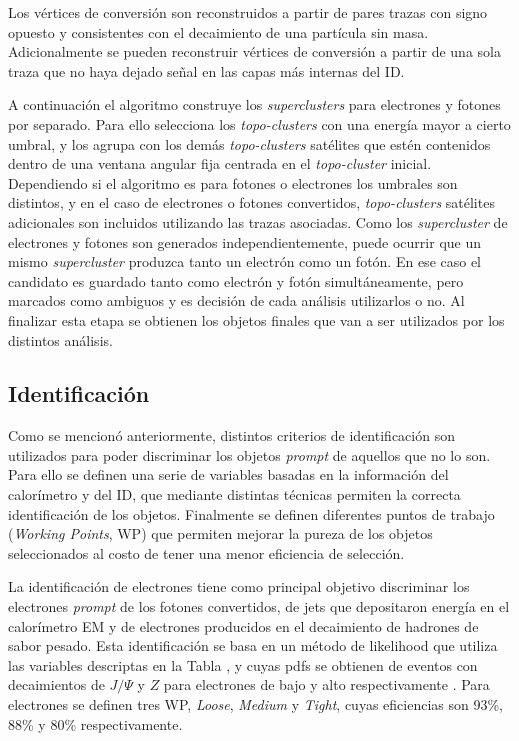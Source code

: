 Los vértices de conversión son reconstruidos a partir de pares trazas con signo opuesto y consistentes con el decaimiento de una partícula sin masa. Adicionalmente se pueden reconstruir vértices de conversión a partir de una sola traza que no haya dejado señal en las capas más internas del ID.

A continuación el algoritmo construye los \textit{superclusters} para electrones y fotones por separado. Para ello selecciona los \textit{topo-clusters} con una energía mayor a cierto  umbral, y los agrupa con los demás \textit{topo-clusters} satélites que estén contenidos dentro de una ventana angular fija centrada en el \textit{topo-cluster} inicial. Dependiendo si el algoritmo es para fotones o electrones los umbrales son distintos, y en el caso de electrones o fotones convertidos, \textit{topo-clusters} satélites adicionales son incluidos utilizando las trazas asociadas. Como los \textit{supercluster} de electrones y fotones son generados independientemente, puede ocurrir que un mismo \textit{supercluster} produzca tanto un electrón como un fotón. En ese caso el candidato es guardado tanto como electrón y fotón simultáneamente, pero marcados como ambiguos y es decisión de cada análisis utilizarlos o no. Al finalizar esta etapa se obtienen los objetos finales que van a ser utilizados por los distintos análisis. 

\subsection{Identificación}

Como se mencionó anteriormente, distintos criterios de identificación son utilizados para poder discriminar los objetos \textit{prompt} de aquellos que no lo son. Para ello se definen una serie de variables basadas en la información del calorímetro y del ID, que mediante distintas técnicas permiten la correcta identificación de los objetos. Finalmente se definen diferentes puntos de trabajo (\textit{Working Points}, WP) que permiten mejorar la pureza de los objetos seleccionados al costo de tener una menor eficiencia de selección.

La identificación de electrones tiene como principal objetivo discriminar los electrones \textit{prompt} de los fotones convertidos, de jets que depositaron energía en el calorímetro EM y de electrones producidos en el decaimiento de hadrones de sabor pesado. Esta identificación se basa en un método de likelihood que utiliza las variables descriptas en la Tabla , y cuyas pdfs se obtienen de eventos con decaimientos de $J/\Psi$ y $Z$ para electrones de bajo y alto \ET respectivamente \cite{PERF-2016-01}. Para electrones se definen tres WP, \textit{Loose}, \textit{Medium} y \textit{Tight}, cuyas eficiencias son  93\%, 88\% y 80\% respectivamente. 

